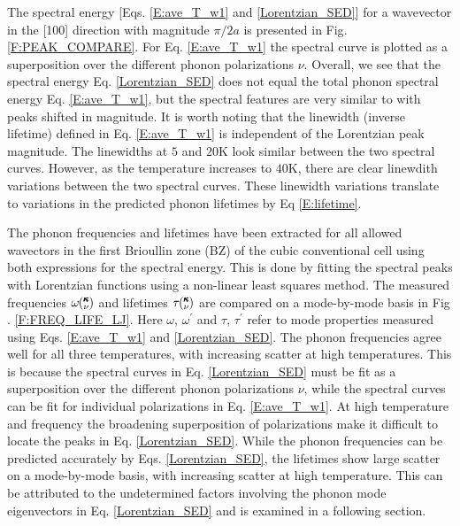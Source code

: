 \documentclass[twocolumn,10pt]{asme2e}
\newcommand{\kv}{\mspace{-4.0mu}\left(\mspace{-8.0mu}\begin{smallmatrix}&\pmb{\kappa} \\&\nu\end{smallmatrix}\mspace{-3.0mu}\right)}
\begin{document}
The spectral energy [Eqs$.$ \eqref{E:ave_T_w1} and \eqref{Lorentzian_SED}] for a wavevector in the [100] direction with magnitude $\pi/2a$ is presented in Fig$.$ \ref{F:PEAK_COMPARE}. For Eq$.$ \eqref{E:ave_T_w1} the spectral curve is plotted as a superposition over the different phonon polarizations $\nu$.  Overall, we see that the spectral energy Eq$.$ \eqref{Lorentzian_SED} does not equal the total phonon spectral energy Eq$.$ \eqref{E:ave_T_w1}, but the spectral features are very similar to with peaks shifted in magnitude. It is worth noting that the linewidth (inverse lifetime) defined in Eq$.$ \eqref{E:ave_T_w1} is independent of the Lorentzian peak magnitude. The linewidths at $5$ and $20$K look similar between the two spectral curves. However, as the temperature increases to $40$K, there are clear linewdith variations between the two spectral curves. These linewidth variations translate to variations in the predicted phonon lifetimes by Eq \eqref{E:lifetime}.

The phonon frequencies and lifetimes have been extracted for all allowed wavectors in the first Brioullin zone (BZ) of the cubic conventional cell using both expressions for the spectral energy. This is done by fitting the spectral peaks with Lorentzian functions using a non-linear least squares method. The measured frequencies $\omega\kv$ and lifetimes $\tau\kv$ are compared on a mode-by-mode basis in Fig$.$ \ref{F:FREQ_LIFE_LJ}. Here $\omega$, $\omega^{'}$ and $\tau$, $\tau^{'}$  refer to mode properties measured using Eqs$.$ \eqref{E:ave_T_w1} and \eqref{Lorentzian_SED}. The phonon frequencies agree well for all three temperatures, with increasing scatter at high temperatures.  This is because the spectral curves in Eq$.$ \eqref{Lorentzian_SED} must be fit as a superposition over the different phonon polarizations $\nu$, while the spectral curves can be fit for individual polarizations in Eq$.$ \eqref{E:ave_T_w1}. At high temperature and frequency the broadening superposition of polarizations make it difficult to locate the peaks in Eq$.$ \eqref{Lorentzian_SED}. While the phonon frequencies can be predicted accurately by Eqs$.$ \eqref{Lorentzian_SED}, the lifetimes show large scatter on a mode-by-mode basis, with increasing scatter at high temperature.  This can be attributed to the undetermined factors involving the phonon mode eigenvectors in Eq$.$ \eqref{Lorentzian_SED} and is examined in a following section.
\end{document}
